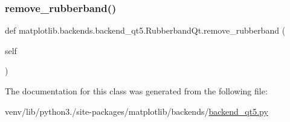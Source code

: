 \subsubsection{\texorpdfstring{remove\+\_\+rubberband()}{remove\_rubberband()}}
{\footnotesize\ttfamily def matplotlib.\+backends.\+backend\+\_\+qt5.\+Rubberband\+Qt.\+remove\+\_\+rubberband (\begin{DoxyParamCaption}\item[{}]{self }\end{DoxyParamCaption})}



The documentation for this class was generated from the following file\+:\begin{DoxyCompactItemize}
\item 
venv/lib/python3./site-\/packages/matplotlib/backends/\hyperlink{backend__qt5_8py}{backend\+\_\+qt5.\+py}\end{DoxyCompactItemize}
